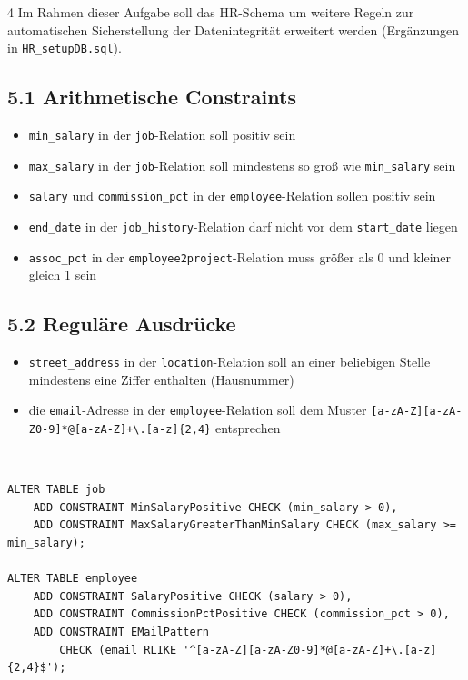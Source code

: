 \documentclass[8pt,a4paper]{extarticle}
\newenvironment{loesung}[1][]{%
    \par\noindent{\bfseries\color{loesungrahmen}\small$\blacktriangleright$~L\"osung#1:}~%
}{\par\smallskip}
\begin{document}
\begin{multicols}{4}
Im Rahmen dieser Aufgabe soll das HR-Schema um weitere Regeln zur automatischen Sicherstellung der Datenintegrit\"at erweitert werden (Erg\"anzungen in \texttt{HR\_setupDB.sql}).

\subsection*{5.1 \quad Arithmetische Constraints}
\begin{itemize}
\item \texttt{min\_salary} in der \texttt{job}-Relation soll positiv sein
\item \texttt{max\_salary} in der \texttt{job}-Relation soll mindestens so gro\ss{} wie \texttt{min\_salary} sein
\item \texttt{salary} und \texttt{commission\_pct} in der \texttt{employee}-Relation sollen positiv sein
\item \texttt{end\_date} in der \texttt{job\_history}-Relation darf nicht vor dem \texttt{start\_date} liegen
\item \texttt{assoc\_pct} in der \texttt{employee2project}-Relation muss gr\"o\ss{}er als 0 und kleiner gleich 1 sein
\end{itemize}

\subsection*{5.2 \quad Regul\"are Ausdr\"ucke}
\begin{itemize}
\item \texttt{street\_address} in der \texttt{location}-Relation soll an einer beliebigen Stelle mindestens eine Ziffer enthalten (Hausnummer)
\item die \texttt{email}-Adresse in der \texttt{employee}-Relation soll dem Muster \texttt{[a-zA-Z][a-zA-Z0-9]*@[a-zA-Z]+\textbackslash.[a-z]\{2,4\}} entsprechen
\end{itemize}

\begin{loesung}[ (5.1 \& 5.2)]
\begin{lstlisting}
ALTER TABLE job
    ADD CONSTRAINT MinSalaryPositive CHECK (min_salary > 0),
    ADD CONSTRAINT MaxSalaryGreaterThanMinSalary CHECK (max_salary >= min_salary);

ALTER TABLE employee
    ADD CONSTRAINT SalaryPositive CHECK (salary > 0),
    ADD CONSTRAINT CommissionPctPositive CHECK (commission_pct > 0),
    ADD CONSTRAINT EMailPattern
        CHECK (email RLIKE '^[a-zA-Z][a-zA-Z0-9]*@[a-zA-Z]+\.[a-z]{2,4}$');


\end{lstlisting}
\end{loesung}
\end{multicols}
\end{document}

